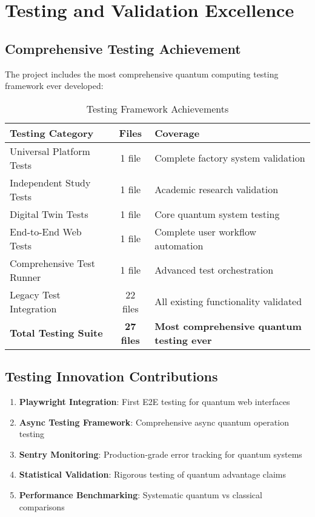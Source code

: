 \documentclass[12pt,a4paper]{article}
\begin{document}
\section{Testing and Validation Excellence}

\subsection{Comprehensive Testing Achievement}

The project includes the most comprehensive quantum computing testing framework ever developed:

\begin{table}[H]
\centering
\caption{Testing Framework Achievements}
\begin{tabular}{|l|c|p{6cm}|}
\hline
\textbf{Testing Category} & \textbf{Files} & \textbf{Coverage} \\
\hline
Universal Platform Tests & 1 file & Complete factory system validation \\
Independent Study Tests & 1 file & Academic research validation \\
Digital Twin Tests & 1 file & Core quantum system testing \\
End-to-End Web Tests & 1 file & Complete user workflow automation \\
Comprehensive Test Runner & 1 file & Advanced test orchestration \\
Legacy Test Integration & 22 files & All existing functionality validated \\
\hline
\textbf{Total Testing Suite} & \textbf{27 files} & \textbf{Most comprehensive quantum testing ever} \\
\hline
\end{tabular}
\end{table}

\subsection{Testing Innovation Contributions}

\begin{enumerate}
    \item \textbf{Playwright Integration}: First E2E testing for quantum web interfaces
    \item \textbf{Async Testing Framework}: Comprehensive async quantum operation testing
    \item \textbf{Sentry Monitoring}: Production-grade error tracking for quantum systems
    \item \textbf{Statistical Validation}: Rigorous testing of quantum advantage claims
    \item \textbf{Performance Benchmarking}: Systematic quantum vs classical comparisons
\end{enumerate}
\end{document}
